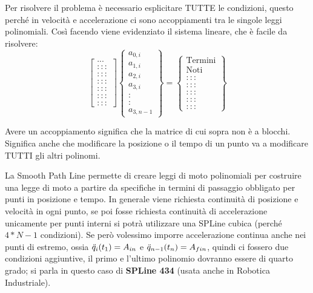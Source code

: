 Per risolvere il problema è necessario esplicitare TUTTE le condizioni, questo perché in velocità e accelerazione ci sono accoppiamenti tra le singole leggi polinomiali.
Così facendo viene evidenziato il sistema lineare, che è facile da risolvere:
\[ 
\begin{bmatrix}
... \\ ::: \\ ::: \\ ::: \\ ::: \\ ::: \\ :::
\end{bmatrix} 
\begin{Bmatrix}
    a_{0,i} \\ a_{1,i} \\ a_{2,i} \\ a_{3,i} \\ : \\ : \\ a_{3,n-1}
\end{Bmatrix} =
\begin{Bmatrix}
    \text{Termini} \\ \text{Noti} \\ ::: \\ ::: \\ ::: \\ ::: \\ :::
\end{Bmatrix}
\]

Avere un accoppiamento significa che la matrice di cui sopra non è a blocchi. Significa anche che modificare la posizione o il tempo di un punto va a modificare TUTTI gli altri polinomi.


La Smooth Path Line permette di creare leggi di moto polinomiali per costruire una legge di moto a partire da specifiche in termini di passaggio obbligato per punti in posizione e tempo.
In generale viene richiesta continuità di posizione e velocità in ogni punto, se poi fosse richiesta continuità di accelerazione unicamente per punti interni si potrà utilizzare una SPLine cubica (perché \(4*N-1\) condizioni).
Se però volessimo imporre accelerazione continua anche nei punti di estremo, ossia \(\Ddot{q}_i(t_1)=A_{in}\) e \(\Ddot{q}_{n-1}(t_n)=A_{fin}\), quindi ci fossero due condizioni aggiuntive, il primo e l'ultimo polinomio dovranno essere di quarto grado; si parla in questo caso di \textbf{SPLine 434} (usata anche in Robotica Industriale).

